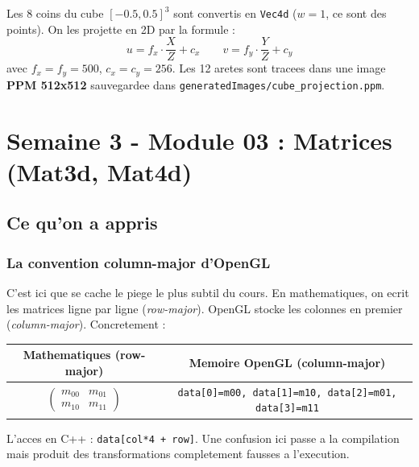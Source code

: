\documentclass[12pt,a4paper]{report}
\newcommand{\code}[1]{\texttt{\textcolor{PrimaryBlue}{#1}}}
\begin{document}
\begin{tpbox}
Les 8 coins du cube $[-0.5, 0.5]^3$ sont convertis en \code{Vec4d} ($w=1$, ce sont des points). On les projette en 2D par la formule :
\[
u = f_x \cdot \frac{X}{Z} + c_x \qquad v = f_y \cdot \frac{Y}{Z} + c_y
\]
avec $f_x=f_y=500$, $c_x=c_y=256$. Les 12 aretes sont tracees dans une image \textbf{PPM 512x512} sauvegardee dans \code{generatedImages/cube\_projection.ppm}.
\end{tpbox}

\chapter{Semaine 3 - Module 03 : Matrices (Mat3d, Mat4d)}

\section{Ce qu'on a appris}

\subsection*{La convention column-major d'OpenGL}

C'est ici que se cache le piege le plus subtil du cours. En mathematiques, on ecrit les matrices ligne par ligne (\textit{row-major}). OpenGL stocke les colonnes en premier (\textit{column-major}). Concretement :

\begin{center}
\begin{tabular}{cc}
  \toprule
  Mathematiques (row-major) & Memoire OpenGL (column-major) \\
  \midrule
  $\begin{pmatrix} m_{00} & m_{01} \\ m_{10} & m_{11} \end{pmatrix}$ &
  \code{data[0]=m00, data[1]=m10, data[2]=m01, data[3]=m11} \\
  \bottomrule
\end{tabular}
\end{center}

L'acces en C++ : \code{data[col*4 + row]}. Une confusion ici passe a la compilation mais produit des transformations completement fausses a l'execution.
\end{document}
